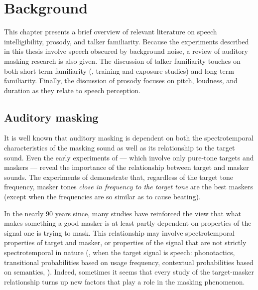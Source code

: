 \chapter{Background\label{chap:Background}}
This chapter presents a brief overview of relevant literature on speech intelligibility, prosody, and talker familiarity.  Because the experiments described in this thesis involve speech obscured by background noise, a review of auditory masking research is also given.  The discussion of talker familiarity touches on both short-term familiarity (\ie, training and exposure studies) and long-term familiarity.  Finally, the discussion of prosody focuses on pitch, loudness, and duration as they relate to speech perception.

\section{Auditory masking}
It is well known that auditory masking is dependent on both the spectrotemporal characteristics of the masking sound as well as its relationship to the target sound.  %
Even the early experiments of \citet{WegelLane1924} — which involve only pure-tone targets and maskers — reveal the importance of the relationship between target and masker sounds.  The experiments of \citeauthor{WegelLane1924} demonstrate that, regardless of the target tone frequency, masker tones \emph{close in frequency to the target tone} are the best maskers (except when the frequencies are so similar as to cause beating).  

In the nearly 90 years since, many studies have reinforced the view that what makes something a good masker is at least partly dependent on properties of the signal one is trying to mask.  This relationship may involve spectrotemporal properties of target and masker, or properties of the signal that are not strictly spectrotemporal in nature (\eg, when the target signal is speech: phonotactics, transitional probabilities based on usage frequency, contextual probabilities based on semantics, \etc).  Indeed, sometimes it seems that every study of the target-masker relationship turns up new factors that play a role in the masking phenomenon.

